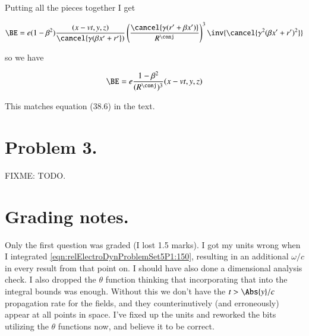 Putting all the pieces together I get

\begin{align*}
\BE 
&= e (1 -\beta^2) \frac{(x - v t, y, z)}{\cancel{\gamma( \beta x' + r'})} \left( \frac{\cancel{\gamma( r' + \beta x')}}{R^\conj} \right)^3 \inv{\cancel{ \gamma^2 (\beta x' + r')^2 } } \\
\end{align*}

so we have

\begin{equation}\label{eqn:relElectroDynProblemSet5:1040}
\BE 
= e \frac{1 -\beta^2}{(R^\conj)^3} (x - v t, y, z) 
\end{equation}

This matches equation (38.6) in the text.  

\section{Problem 3.}

FIXME: TODO.

\section{Grading notes.}

Only the first question was graded (I lost 1.5 marks).  I got my units wrong when I integrated \ref{eqn:relElectroDynProblemSet5P1:150}, resulting in an additional $\omega/c$ in every result from that point on.  I should have also done a dimensional analysis check.  I also dropped the $\theta$ function thinking that incorporating that into the integral bounds was enough.  Without this we don't have the $t > \Abs{y}/c$ propagation rate for the fields, and they counterinutively (and erroneously) appear at all points in space.  I've fixed up the units and reworked the bits utilizing the $\theta$ functions now, and believe it to be correct.

\EndArticle
